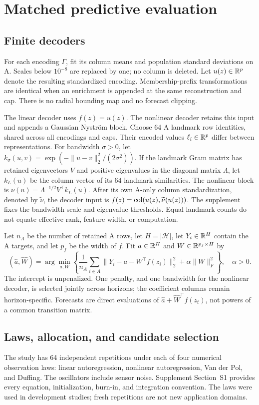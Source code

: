 \section{Matched predictive evaluation}\label{sec:evaluation}
\subsection{Finite decoders}
For each encoding $\Gamma$, fit its column means and population standard deviations on A. Scales below $10^{-8}$ are replaced by one; no column is deleted. Let $u(z)\in\mathbb R^p$ denote the resulting standardized encoding. Membership-prefix transformations are identical when an enrichment is appended at the same reconstruction and cap. There is no radial bounding map and no forecast clipping.

The linear decoder uses $f(z)=u(z)$. The nonlinear decoder retains this input and appends a Gaussian Nystr\"om block. Choose 64 A landmark row identities, shared across all encodings and caps. Their encoded values $\ell_i\in\mathbb R^p$ differ between representations. For bandwidth $\sigma>0$, let $k_\sigma(u,v)=\exp(-\|u-v\|_2^2/(2\sigma^2))$. If the landmark Gram matrix has retained eigenvectors $V$ and positive eigenvalues in the diagonal matrix $\Lambda$, let $k_L(u)$ be the column vector of its 64 landmark similarities. The nonlinear block is $\nu(u)=\Lambda^{-1/2}V^\top k_L(u)$. After its own A-only column standardization, denoted by $\widetilde\nu$, the decoder input is $f(z)=\operatorname{col}(u(z),\widetilde\nu(u(z)))$. The supplement fixes the bandwidth scale and eigenvalue thresholds. Equal landmark counts do not equate effective rank, feature width, or computation.

Let $n_A$ be the number of retained A rows, let $H=|\mathcal H|$, let $Y_i\in\mathbb R^H$ contain the A targets, and let $p_f$ be the width of $f$. Fit $a\in\mathbb R^H$ and $W\in\mathbb R^{p_f\times H}$ by
\begin{equation}
 (\widehat a,\widehat W)=\arg\min_{a,W}
 \left\{\frac1{n_A}\sum_{i\in A}\|Y_i-a-W^\top f(z_i)\|_2^2+\alpha\|W\|_F^2\right\},\quad\alpha>0.
 \label{eq:ridge}
\end{equation}
The intercept is unpenalized. One penalty, and one bandwidth for the nonlinear decoder, is selected jointly across horizons; the coefficient columns remain horizon-specific. Forecasts are direct evaluations of $\widehat a+\widehat W^\top f(z_t)$, not powers of a common transition matrix.

\subsection{Laws, allocation, and candidate selection}
The study has 64 independent repetitions under each of four numerical observation laws: linear autoregression, nonlinear autoregression, Van der Pol, and Duffing. The oscillators include sensor noise. Supplement Section~S1 provides every equation, initialization, burn-in, and integration convention. The laws were used in development studies; fresh repetitions are not new application domains.

